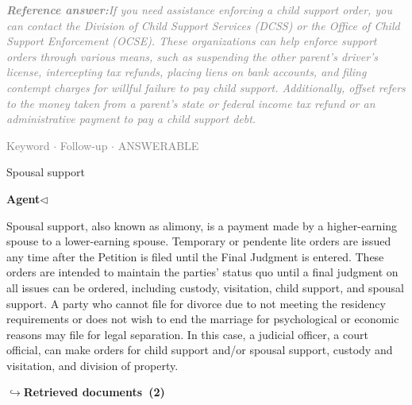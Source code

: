 \documentclass[a4paper,11pt]{article}
\begin{document}
\begin{refanswerenv}
{\footnotesize\textit{\textcolor{gray}{\textbf{Reference answer:}\enspace If you need assistance enforcing a child support order, you can contact the Division of Child Support Services (DCSS) or the Office of Child Support Enforcement (OCSE). These organizations can help enforce support orders through various means, such as suspending the other parent's driver's license, intercepting tax refunds, placing liens on bank accounts, and filing contempt charges for willful failure to pay child support. Additionally, offset refers to the money taken from a parent's state or federal income tax refund or an administrative payment to pay a child support debt.}}}
\end{refanswerenv}
\vspace{0.5em}
\hfill{\tiny\textcolor{gray}{Keyword $\cdot$ Follow-up $\cdot$ ANSWERABLE}}
\begin{userbubble}
Spousal support
\end{userbubble}
\noindent\hfill{\small\textcolor{agentcolor}{\textbf{Agent\enspace$\triangleleft$}}}
\begin{agentbubble}
Spousal support, also known as alimony, is a payment made by a higher-earning spouse to a lower-earning spouse. Temporary or pendente lite orders are issued any time after the Petition is filed until the Final Judgment is entered. These orders are intended to maintain the parties' status quo until a final judgment on all issues can be ordered, including custody, visitation, child support, and spousal support. A party who cannot file for divorce due to not meeting the residency requirements or does not wish to end the marriage for psychological or economic reasons may file for legal separation. In this case, a judicial officer, a court official, can make orders for child support and/or spousal support, custody and visitation, and division of property.
\end{agentbubble}
\noindent\hfill{\footnotesize\textcolor{doccolor}{\textbf{$\hookrightarrow$\enspace Retrieved documents~(2)}}}
\end{document}
